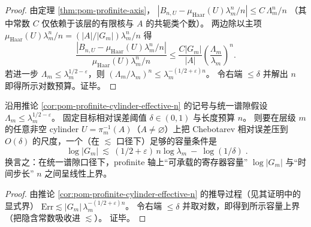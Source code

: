 \begin{proof}
由定理 \ref{thm:pom-profinite-axis}，
\(
|B_{n,U}-\mu_{\mathrm{Haar}}(U)\lambda_m^n/n|\le C\,\Lambda_m^n/n
\)
（其中常数 \(C\) 仅依赖于该层的有限核与 \(A\) 的共轭类个数）。
两边除以主项 \(\mu_{\mathrm{Haar}}(U)\lambda_m^n/n=(|A|/|G_m|)\lambda_m^n/n\) 得
\[
\frac{|B_{n,U}-\mu_{\mathrm{Haar}}(U)\lambda_m^n/n|}{\mu_{\mathrm{Haar}}(U)\lambda_m^n/n}
\le
\frac{C|G_m|}{|A|}\left(\frac{\Lambda_m}{\lambda_m}\right)^n.
\]
若进一步 \(\Lambda_m\le \lambda_m^{1/2-\varepsilon}\)，则 \((\Lambda_m/\lambda_m)^n\le \lambda_m^{-(1/2+\varepsilon)n}\)。
令右端 \(\le \delta\) 并解出 \(n\) 即得所示对数预算。证毕。
\end{proof}

\begin{corollary}\label{cor:pom-profinite-cylinder-capacity}
沿用推论 \ref{cor:pom-profinite-cylinder-effective-n} 的记号与统一谱隙假设
\(
\Lambda_m\le \lambda_m^{1/2-\varepsilon}
\)。
固定目标相对误差阈值 \(\delta\in(0,1)\) 与长度预算 \(n\)。
则要在层级 \(m\) 的任意非空 cylinder \(U=\pi_m^{-1}(A)\)（\(A\neq\varnothing\)）上把 Chebotarev 相对误差压到 \(O(\delta)\) 的尺度，一个（在 \(\lesssim\) 口径下）足够的容量条件是
\[
\boxed{\;
\log |G_m|\ \lesssim\ (1/2+\varepsilon)\,n\log\lambda_m\ -\ \log(1/\delta)\; }.
\]
换言之：在统一谱隙口径下，profinite 轴上“可承载的寄存器容量” \(\log|G_m|\) 与“时间步长” \(n\) 之间呈线性上界。
\end{corollary}
\begin{proof}
由推论 \ref{cor:pom-profinite-cylinder-effective-n} 的推导过程（见其证明中的显式界）
\(
\mathrm{Err}\lesssim |G_m|\,\lambda_m^{-(1/2+\varepsilon)n}
\)。
令右端 \(\le \delta\) 并取对数，即得到所示容量上界（把隐含常数吸收进 \(\lesssim\)）。
证毕。
\end{proof}

